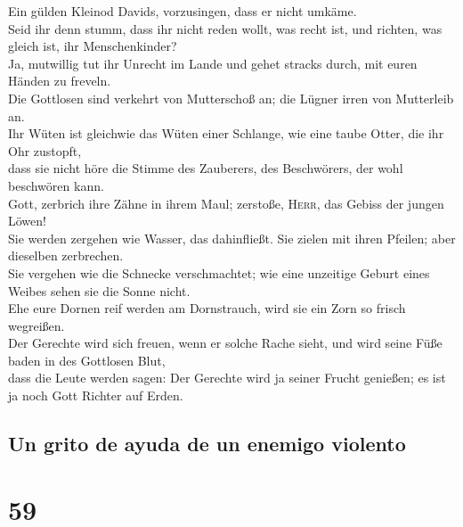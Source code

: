  Ein gülden Kleinod Davids, vorzusingen, dass er nicht
umkäme.\\
 Seid ihr denn stumm, dass ihr nicht reden wollt, was
recht ist, und richten, was gleich ist, ihr Menschenkinder?\\
 Ja, mutwillig tut ihr Unrecht im Lande und gehet stracks
durch, mit euren Händen zu freveln.\\
 Die Gottlosen sind verkehrt von Mutterschoß an; die
Lügner irren von Mutterleib an.\\
 Ihr Wüten ist gleichwie das Wüten einer Schlange, wie
eine taube Otter, die ihr Ohr zustopft,\\
 dass sie nicht höre die Stimme des Zauberers, des
Beschwörers, der wohl beschwören kann.\\
 Gott, zerbrich ihre Zähne in ihrem Maul; zerstoße,
\textsc{Herr}, das Gebiss der jungen Löwen!\\
 Sie werden zergehen wie Wasser, das dahinfließt. Sie
zielen mit ihren Pfeilen; aber dieselben zerbrechen.\\
 Sie vergehen wie die Schnecke verschmachtet; wie eine
unzeitige Geburt eines Weibes sehen sie die Sonne nicht.\\
 Ehe eure Dornen reif werden am Dornstrauch, wird sie ein
Zorn so frisch wegreißen.\\
 Der Gerechte wird sich freuen, wenn er solche Rache
sieht, und wird seine Füße baden in des Gottlosen Blut,\\
 dass die Leute werden sagen: Der Gerechte wird ja seiner
Frucht genießen; es ist ja noch Gott Richter auf Erden.

\hypertarget{un-grito-de-ayuda-de-un-enemigo-violento}{%
\subsection{Un grito de ayuda de un enemigo
violento}\label{un-grito-de-ayuda-de-un-enemigo-violento}}

\hypertarget{section-58}{%
\section{59}\label{section-58}}

